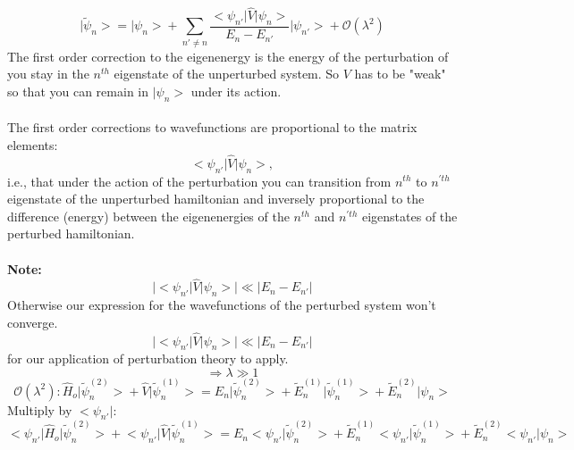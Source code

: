 \documentclass[12pt]{article}
\begin{document}
\begin{equation}
	\big| \tilde{\psi}_n \big> = \big| \psi_n \big> +\sum_{n' \neq n}
	\frac{\big< \psi_{n'}\big|\hat{V}\big|\psi_n\big>}{E_n - E_{n'}}\big|\psi_{n'}\big> + \mathcal{O}(\lambda^2)
\end{equation}
The first order correction to the eigenenergy is the energy of the perturbation of you stay in the
$n^{th}$ eigenstate of the unperturbed system. So $V$  has to be "weak" so that you can remain in
$\big|\psi_n\big>$ under its action.\\
\\
The first order corrections to wavefunctions are proportional to the matrix elements: 
$$\big<\psi_{n'}\big|\hat{V}\big|\psi_n\big>,$$
i.e., that under the action of the perturbation you can transition from $n^{th}$ to $n^{'th}$ 
eigenstate of the unperturbed hamiltonian and inversely proportional to the difference (energy)
between the eigenenergies of the $n^{th}$ and $n^{'th}$  eigenstates of the perturbed hamiltonian.\\
\\
\textbf{Note:}
\begin{equation*}
	\big|\big<\psi_{n'} \big| \hat{V}\big| \psi_n \big> \big| \ll \big|E_n - E_{n'}\big|
\end{equation*}
Otherwise our expression for the wavefunctions of the perturbed system won't converge.
$$	\big|\big<\psi_{n'} \big| \hat{V}\big| \psi_n \big> \big| \ll \big|E_n - E_{n'}\big|$$ 
for our application of perturbation theory to apply.
$$\Longrightarrow \lambda \gg 1$$
\begin{equation*}
	\mathcal{O}(\lambda ^2): \hat{H}_o \big|\tilde{\psi}^{(2)}_n\big> + \hat{V}\big|\tilde{\psi}^{(1)}_n\big>
	= E_n \big|\tilde{\psi}^{(2)}_n \big> + \tilde{E}^{(1)}_n \big|\tilde{\psi}^{(1)}_n \big>
	+ \tilde{E}^{(2)}_n \big| \psi_n \big>
\end{equation*}
Multiply by $\big< \psi_{n'} \big|$:
\begin{equation*}
	\big< \psi_{n'} \big|\hat{H}_o \big|\tilde{\psi}^{(2)}_n\big> + 
	\big< \psi_{n'} \big|\hat{V}\big|\tilde{\psi}^{(1)}_n\big>
	= E_n \big< \psi_{n'} \big|\tilde{\psi}^{(2)}_n \big> + 
	\tilde{E}^{(1)}_n \big< \psi_{n'} \big|\tilde{\psi}^{(1)}_n \big>
	+ \tilde{E}^{(2)}_n \big< \psi_{n'} \big| \psi_n \big>	
\end{equation*}
\end{document}
